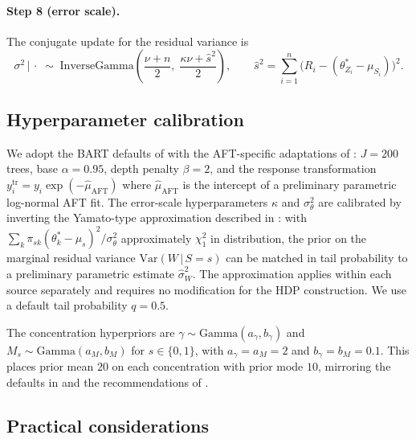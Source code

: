 \documentclass[11pt]{article}
\newcommand{\Var}{\mathrm{Var}}
\newcommand{\given}{\,|\,}
\begin{document}
\paragraph{Step 8 (error scale).} The conjugate update for the residual variance is
\begin{equation}
\sigma^2 \given \cdot \;\sim\; \mathrm{InverseGamma}\!\left(\frac{\nu + n}{2},\; \frac{\kappa\nu + \hat s^2}{2}\right), \qquad \hat s^2 = \sum_{i=1}^n \big(R_i - (\theta_{Z_i}^* - \mu_{S_i})\big)^2.
\end{equation}

\subsection{Hyperparameter calibration}
\label{app:hdp-hyperparameters}

We adopt the BART defaults of \citet{chipman2010bart} with the AFT-specific adaptations of \citet{henderson2020individualized}: $J = 200$ trees, base $\alpha = 0.95$, depth penalty $\beta = 2$, and the response transformation $y_i^{\mathrm{tr}} = y_i \exp(-\hat\mu_{\mathrm{AFT}})$ where $\hat\mu_{\mathrm{AFT}}$ is the intercept of a preliminary parametric log-normal AFT fit. The error-scale hyperparameters $\kappa$ and $\sigma_\theta^2$ are calibrated by inverting the Yamato-type approximation \citep{yamato1984characteristic} described in \citet[Section 2.4]{henderson2020individualized}: with $\sum_k \pi_{sk}(\theta_k^* - \mu_s)^2 / \sigma_\theta^2$ approximately $\chi^2_1$ in distribution, the prior on the marginal residual variance $\Var(W \given S = s)$ can be matched in tail probability to a preliminary parametric estimate $\hat \sigma_W^2$. The approximation applies within each source separately and requires no modification for the HDP construction. We use a default tail probability $q = 0.5$.

The concentration hyperpriors are $\gamma \sim \mathrm{Gamma}(a_\gamma, b_\gamma)$ and $M_s \sim \mathrm{Gamma}(a_M, b_M)$ for $s \in \{0, 1\}$, with $a_\gamma = a_M = 2$ and $b_\gamma = b_M = 0.1$. This places prior mean $20$ on each concentration with prior mode $10$, mirroring the defaults in \citet{henderson2020individualized} and the recommendations of \citet{teh2006hierarchical}.

\subsection{Practical considerations}
\label{app:hdp-practical}
\end{document}
